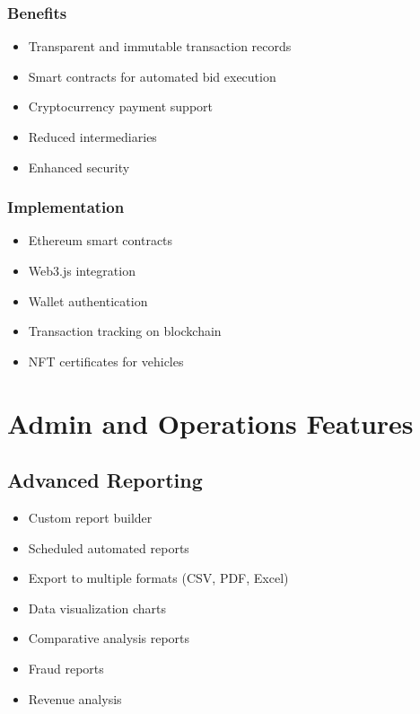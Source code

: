 \subsubsection{Benefits}
\begin{itemize}
    \item Transparent and immutable transaction records
    \item Smart contracts for automated bid execution
    \item Cryptocurrency payment support
    \item Reduced intermediaries
    \item Enhanced security
\end{itemize}

\subsubsection{Implementation}
\begin{itemize}
    \item Ethereum smart contracts
    \item Web3.js integration
    \item Wallet authentication
    \item Transaction tracking on blockchain
    \item NFT certificates for vehicles
\end{itemize}

\section{Admin and Operations Features}

\subsection{Advanced Reporting}

\begin{itemize}
    \item Custom report builder
    \item Scheduled automated reports
    \item Export to multiple formats (CSV, PDF, Excel)
    \item Data visualization charts
    \item Comparative analysis reports
    \item Fraud reports
    \item Revenue analysis
\end{itemize}

